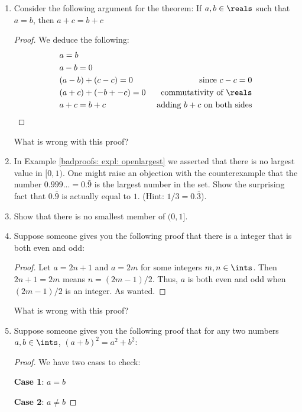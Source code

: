 \documentclass[../proofs.tex]{subfiles}
\begin{document}
\begin{enumerate}
  \item Consider the following argument for the theorem:
  If $a, b \in \reals$ such that $a = b$, then $a + c = b + c$
  \begin{proof} We deduce the following:
    \begin{align*}
      &a = b \\
      &a-b = 0 \\
      &(a-b) + (c-c) = 0 & \justify{since $c-c = 0$} \\
      &(a+c) + (-b + -c) = 0 & \justify{commutativity of $\reals$} \\
      &a + c = b + c & \justify{ adding $b + c$ on both sides} %
    \end{align*}
  \end{proof}
  What is wrong with this proof? %

  \item In Example \ref{badproofs: expl: openlargest} we asserted that there
  is no largest value in $[0, 1)$. One might raise an objection with the
  counterexample that the number $0.999... = 0.\bar{9}$ is the largest number
  in the set. Show the surprising fact that $0.\bar{9}$ is actually equal to
  $1$. (Hint: $1/3 = 0.\bar{3}$).

  \item Show that there is no smallest member of $(0, 1]$.
  \item Suppose someone gives you the following proof that there is 
  a integer that is both even and odd:
  \begin{proof}
    Let $a = 2n + 1$ and $a = 2m$ for some integers $m, n \in \ints$.
    Then $2n + 1 = 2m$ means $n = (2m - 1)/2$. Thus, $a$ is both even and odd
    when $(2m - 1)/2$ is an integer. As wanted.
  \end{proof}
  What is wrong with this proof? %

  \item Suppose someone gives you the following proof that for any two
  numbers $a, b \in \ints$, $(a+b)^2 = a^2 + b^2$:
  \begin{proof}
    We have two cases to check:
    
    \textbf{Case 1}: $a = b$

    \textbf{Case 2}: $a \neq b$
  \end{proof}
\end{enumerate}
\end{document}
